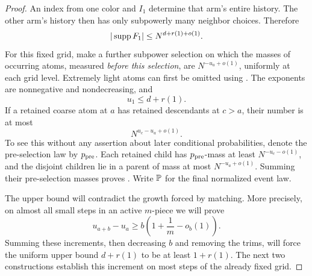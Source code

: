 \begin{proof}
An index from one color and \(I_1\) determine that arm's entire
history.  The other arm's history then has only subpowerly many
neighbor choices.  Therefore
\begin{equation}
 |\operatorname{supp} F_1|\le N^{d+r(1)+o(1)}.
 \label{a02:state-support}
\end{equation}
For this fixed grid, make a further subpower selection on which the
masses of occurring atoms, measured \emph{before this selection},
are \(N^{-u_a+o(1)}\), uniformly at each grid level.  Extremely light
atoms can first be omitted using .  The
exponents are nonnegative and nondecreasing, and
\begin{equation}
 u_1\le d+r(1).
 \label{a02:state-upper}
\end{equation}
If a retained coarse atom at \(a\) has retained descendants at
\(c>a\), their number is at most
\begin{equation}
 N^{u_c-u_a+o(1)}.
 \label{a02:descendant-count}
\end{equation}
To see this without any assertion about later conditional
probabilities, denote the pre-selection law by \(p_{\rm pre}\).
Each retained child has \(p_{\rm pre}\)-mass at least
\(N^{-u_c-o(1)}\), and the disjoint children lie in a parent of mass
at most \(N^{-u_a+o(1)}\).  Summing their pre-selection masses proves
.  Write \(\mathbb P\) for the final normalized
event law.

The upper bound  will contradict the growth
forced by matching.  More precisely, on almost all small steps in
an active \(m\)-piece we will prove
\[
 u_{a+b}-u_a\ge b\left(1+\frac1m-o_b(1)\right).
\]
Summing these increments, then decreasing \(b\) and removing the
trims, will force the uniform upper bound \(d+r(1)\) to be at least
\(1+r(1)\).
The next two constructions establish this increment on most steps
of the already fixed grid.


\end{proof}
